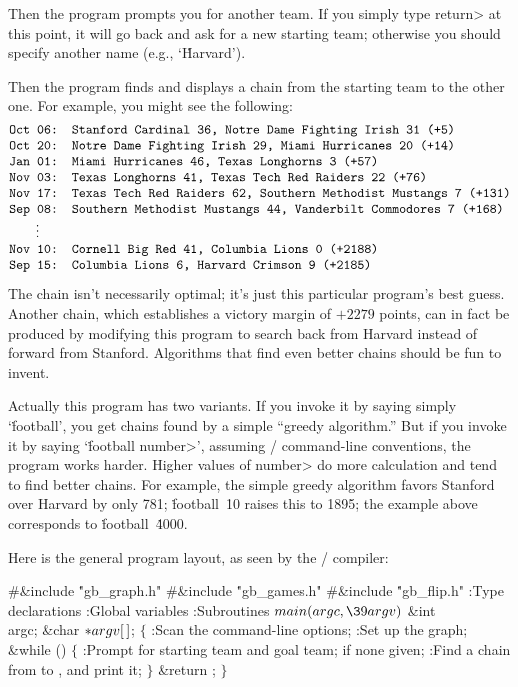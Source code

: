 Then the program prompts you for another team. If you simply type
\<return> at this point, it will go back and ask for a new starting team;
otherwise you should specify another name (e.g., `\.{Harvard}').

Then the program finds and displays a chain from the starting team
to the other one. For example, you might see the following:
$$\vbox{\halign{\tt#\hfil\cr
Oct 06: Stanford Cardinal 36, Notre Dame Fighting Irish 31 (+5)\cr
Oct 20: Notre Dame Fighting Irish 29, Miami Hurricanes 20 (+14)\cr
Jan 01: Miami Hurricanes 46, Texas Longhorns 3 (+57)\cr
Nov 03: Texas Longhorns 41, Texas Tech Red Raiders 22 (+76)\cr
Nov 17: Texas Tech Red Raiders 62, Southern Methodist Mustangs 7 (+131)\cr
Sep 08: Southern Methodist Mustangs 44, Vanderbilt Commodores 7 (+168)\cr
\omit\qquad\vdots\cr
Nov 10: Cornell Big Red 41, Columbia Lions 0 (+2188)\cr
Sep 15: Columbia Lions 6, Harvard Crimson 9 (+2185)\cr}}$$
The chain isn't necessarily optimal; it's just this particular
program's best guess. Another chain, which establishes a victory margin
of $+2279$ points, can in fact be produced by modifying this
program to search back from Harvard instead of forward from Stanford.
Algorithms that find even better chains should be fun to invent.

Actually this program has two variants. If you invoke it by saying simply
`\.{football}', you get chains found by a simple ``greedy algorithm.''
But if you invoke it by saying `\.{football} \<number>', assuming \UNIX/
command-line conventions, the program works harder. Higher values of
\<number> do more calculation and tend to find better chains. For
example, the simple greedy algorithm favors Stanford over Harvard by
only 781; \.{football}~\.{10} raises this to 1895; the
example above corresponds to \.{football}~\.{4000}.

\fi

Here is the general program layout, as seen by the \CEE/ compiler:

\Y\B\8\#\&{include} \.{"gb\_graph.h"}\6
\8\#\&{include} \.{"gb\_games.h"}\6
\8\#\&{include} \.{"gb\_flip.h"}\6
\ATH\7
:Type declarations\X\6
:Global variables\X\6
:Subroutines\X\7
${}\\{main}(\\{argc},\39\\{argv}){}$\1\1\6
\&{int} \\{argc};\6
\&{char} ${}{*}\\{argv}[\,]{}$;\2\2\6
${}\{{}$\1\6
:Scan the command-line options\X;\6
:Set up the graph\X;\6
\&{while} ()\5
${}\{{}$\1\6
:Prompt for starting team and goal team;  if none given\X;\6
:Find a chain from  to , and print it\X;\6
\4${}\}{}$\2\6
\&{return} ;\6
\4${}\}{}$\2\par
\fi


